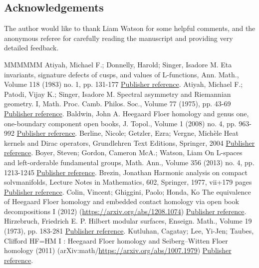 \documentclass[11pt]{article}
\theoremstyle{definition}
\numberwithin{equation}{section}
\numberwithin{figure}{section}
\numberwithin{table}{section}
\begin{document}
\subsection*{Acknowledgements}
The author would like to thank Liam Watson for some helpful comments, and the anonymous referee for carefully reading the manuscript and providing very detailed feedback.

\begin{thebibliography}{MMMMMM}
 Atiyah, Michael F.; Donnelly, Harold; Singer, Isadore M. Eta invariants, signature defects of cusps, and values of L-functions, Ann. Math., Volume 118 (1983) no. 1, pp. 131-177 \href{https://ahl.centre-mersenne.org/item/AHL_2020__3__1117_0/#ADS}{Publisher reference}.
 Atiyah, Michael F.; Patodi, Vijay K.; Singer, Isadore M. Spectral asymmetry and Riemannian geometry. I, Math. Proc. Camb. Philos. Soc., Volume 77 (1975), pp. 43-69 \href{https://ahl.centre-mersenne.org/item/AHL_2020__3__1117_0/#APS}{Publisher reference}.
 Baldwin, John A. Heegaard Floer homology and genus one, one-boundary component open books, J. Topol., Volume 1 (2008) no. 4, pp. 963-992 \href{https://ahl.centre-mersenne.org/item/AHL_2020__3__1117_0/#Bal}{Publisher reference}.
 Berline, Nicole; Getzler, Ezra; Vergne, Michèle Heat kernels and Dirac operators, Grundlehren Text Editions, Springer, 2004 \href{https://ahl.centre-mersenne.org/item/AHL_2020__3__1117_0/#BGV}{Publisher reference}.
 Boyer, Steven; Gordon, Cameron McA.; Watson, Liam On L-spaces and left-orderable fundamental groups, Math. Ann., Volume 356 (2013) no. 4, pp. 1213-1245 \href{https://ahl.centre-mersenne.org/item/AHL_2020__3__1117_0/#BCW}{Publisher reference}.
 Brezin, Jonathan Harmonic analysis on compact solvmanifolds, Lecture Notes in Mathematics, 602, Springer, 1977, vii+179 pages \href{https://ahl.centre-mersenne.org/item/AHL_2020__3__1117_0/#Bre}{Publisher reference}.
 Colin, Vincent; Ghiggini, Paolo; Honda, Ko The equivalence of Heegaard Floer homology and embedded contact homology via open book decompositions I (2012) (\url{https://arxiv.org/abs/1208.1074}) \href{https://ahl.centre-mersenne.org/item/AHL_2020__3__1117_0/#CGH1}{Publisher reference}.
 Hirzebruch, Friedrich E. P. Hilbert modular surfaces, Enseign. Math., Volume 19 (1973), pp. 183-281 \href{https://ahl.centre-mersenne.org/item/AHL_2020__3__1117_0/#Hir}{Publisher reference}.
 Kutluhan, Cagatay; Lee, Yi-Jen; Taubes, Clifford HF=HM I : Heegaard Floer homology and Seiberg–Witten Floer homology (2011) (arXiv:math/\url{https://arxiv.org/abs/1007.1979}) \href{https://ahl.centre-mersenne.org/item/AHL_2020__3__1117_0/#HFHM1}{Publisher reference}.

\end{thebibliography}
\end{document}
